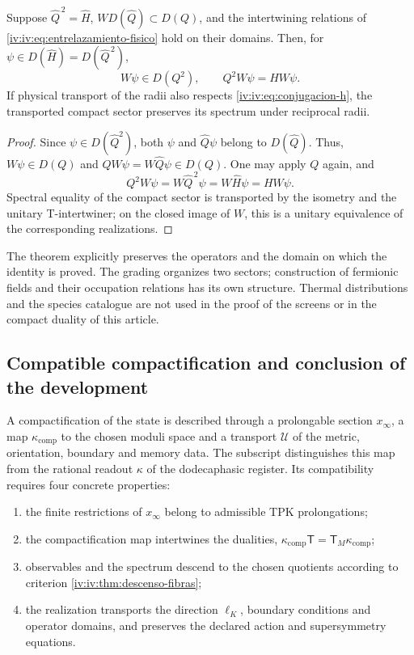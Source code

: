 \begin{theorem}
\label{iv:iv:thm:supercarga-transporte}
Suppose \(\widehat Q^{\,2}=\widehat H\),
\(W D(\widehat Q)\subset D(Q)\), and the
intertwining relations of \eqref{iv:iv:eq:entrelazamiento-fisico}
hold on their domains. Then, for
\(\psi\in D(\widehat H)=D(\widehat Q^{\,2})\),
\[
 W\psi\in D(Q^2),\qquad Q^2W\psi=HW\psi.
\]
If physical transport of the radii also respects
\eqref{iv:iv:eq:conjugacion-h}, the transported compact
sector preserves its spectrum under reciprocal radii.
\end{theorem}
\begin{proof}
Since \(\psi\in D(\widehat Q^2)\), both
\(\psi\) and \(\widehat Q\psi\) belong
to \(D(\widehat Q)\). Thus, \(W\psi\in D(Q)\)
and \(QW\psi=W\widehat Q\psi\in D(Q)\). One may
apply \(Q\) again, and
\[
 Q^2W\psi=W\widehat Q^{\,2}\psi
          =W\widehat H\psi=HW\psi.
\]
Spectral equality of the compact sector is transported
by the isometry and the unitary T-intertwiner;
on the closed image of \(W\), this is a
unitary equivalence of the corresponding realizations.
\end{proof}

The theorem explicitly preserves the operators and the
domain on which the identity is proved. The
grading organizes two sectors; construction of
fermionic fields and their occupation relations has
its own structure. Thermal distributions and the
species catalogue are not used in the proof
of the screens or in the compact duality of this
article.

\subsection{Compatible compactification and conclusion of the development}

A compactification of the state is described through
a prolongable section \(x_\infty\), a map
\(\kappa_{\mathrm{comp}}\) to the chosen moduli
space and a transport \(\mathcal U\) of the
metric, orientation, boundary and memory data. The
subscript distinguishes this map from the rational readout
\(\kappa\) of the dodecaphasic register. Its compatibility
requires four concrete properties:
\begin{enumerate}
\item the finite restrictions of \(x_\infty\)
      belong to admissible TPK prolongations;
\item the compactification map intertwines the dualities,
      \(\kappa_{\mathrm{comp}}\mathsf T
        =\mathsf T_M\kappa_{\mathrm{comp}}\);
\item observables and the spectrum descend to the
      chosen quotients according to criterion
      \ref{iv:iv:thm:descenso-fibras};
\item the realization transports the direction
      \(\ell_K\), boundary conditions and operator
      domains, and preserves the declared action
      and supersymmetry equations.
\end{enumerate}

